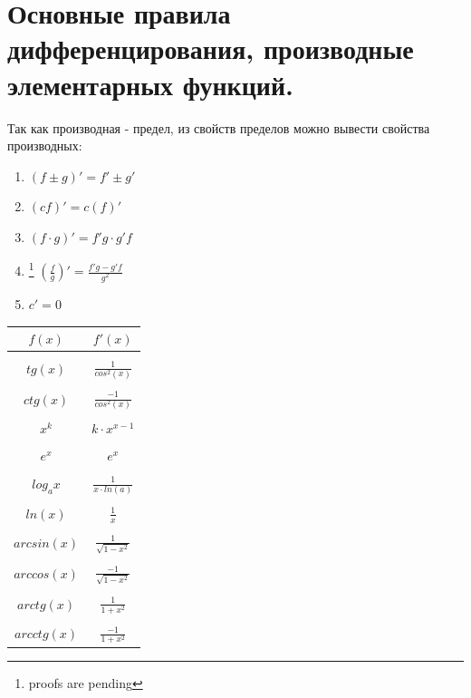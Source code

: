 \documentclass[oneside]{book}
\begin{document}
\chapter[правила дифференцирования]{Основные правила дифференцирования, производные элементарных функций.}
Так как производная - предел, из свойств пределов можно вывести свойства производных:
\begin{enumerate}
  \item $(f \pm g)' = f' \pm g'$
  \item $(cf)' = c(f)'$
  \item $(f \cdot g)' = f'g \cdot g'f$
  \item\footnote{proofs are pending} $(\frac{f}{g})' = \frac{f'g - g'f}{g^2}$
  \item $c' = 0$
\end{enumerate}
  \begin{center}
      \begin{tabular}{c|c}
        $f(x)$ & $f'(x)$ \\
        \hline \\
        $tg(x)$ & $\frac{1}{cos^2(x)}$ \\
          \hline \\
        $ctg(x)$ & $\frac{-1}{cos^2(x)}$ \\
          \hline \\
        $x^k$ & $k \cdot x^{x-1}$ \\
          \hline \\
        $e^x$ & $e^x$ \\
          \hline \\
        $log_a x$ & $\frac{1}{x \cdot ln(a)}$ \\
          \hline \\
        $ln(x)$ & $\frac{1}{x}$ \\
          \hline \\
        $arcsin(x)$ & $\frac{1}{\sqrt{1 - x^2}}$ \\
          \hline \\
        $arccos(x)$ & $\frac{-1}{\sqrt{1 - x^2}}$ \\
          \hline \\
        $arctg(x)$ & $\frac{1}{1 + x^2}$ \\
          \hline \\
        $arcctg(x)$ & $\frac{-1}{1 + x^2}$ \\
      \end{tabular}
  \end{center}
\end{document}
